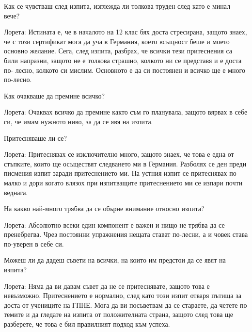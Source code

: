 \begin{multicols}{3}


Как се чувстваш след изпита, изглежда ли толкова труден след като е минал вече?

Лорета: Истината е, че в началото на 12 клас бях доста стресирана, защото знаех, че с този сертификат мога да уча в Германия, което всъщност беше и моето основно желание. Сега, след изпита, разбрах, че всички тези притеснения са били напразни, защото не е толкова страшно, колкото ни се представя и е доста по- лесно, колкото си мислим. Основното е да си постоянен и всичко ще е много по-лесно.

Как очакваше да премине всичко? 

Лорета:  Очаквах всичко да премине както съм го планувала, защото вярвах в себе си, че имам нужното ниво, за да се явя на изпита.

Притесняваше ли се?

Лорета: Притеснявах се изключително много, защото знаех, че това е една от стъпките, които ще осъществят следването ми в Германия. Разболях се ден преди писмения изпит заради притеснението ми. На устния изпит се притеснявах по-малко и дори когато влязох при изпитващите притеснението ми се изпари почти веднага.

На какво най-много трябва да се обърне внимание относно изпита?

Лорета: Абсолютно всеки един компонент е важен и нищо не трябва да се пренебрегва. Чрез постоянни упражнения нещата стават по-лесни, а и човек става по-уверен в себе си.

Можеш ли да дадеш съвети на всички, на които им предстои да се явят на изпита?

Лорета: Няма да ви давам съвет да не се притеснявате, защото това е невъзможно. Притеснението е нормално, след като този изпит отваря пътища за доста от учениците на ГПНЕ. Мога да ви посъветвам да се стараете, да четете по темите и да гледате на изпита от положителната страна, защото след това ще разберете, че това е бил правилният подход към успеха.
\closearticle
\end{multicols}
